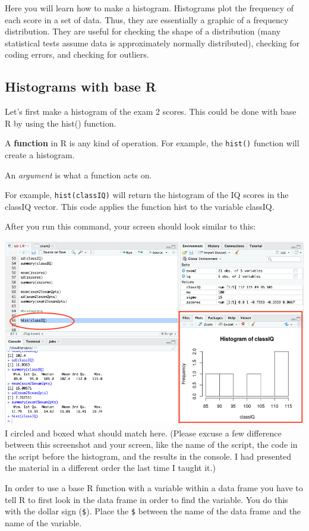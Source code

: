 \documentclass[
]{book}
\begin{document}
Here you will learn how to make a histogram. Histograms plot the frequency of each score in a set of data. Thus, they are essentially a graphic of a frequency distribution. They are useful for checking the shape of a distribution (many statistical tests assume data is approximately normally distributed), checking for coding errors, and checking for outliers.

\hypertarget{histograms-with-base-r}{%
\subsection{Histograms with base R}\label{histograms-with-base-r}}

Let's first make a histogram of the exam 2 scores. This could be done with base R by using the hist() function.

A \textbf{function} in R is any kind of operation. For example, the \texttt{hist()} function will create a histogram.

An \emph{argument} is what a function acts on.

For example, \texttt{hist(classIQ)} will return the histogram of the IQ scores in the classIQ vector. This code applies the function hist to the variable classIQ.

After you run this command, your screen should look similar to this:

\includegraphics{img/basehist.png}
I circled and boxed what should match here. (Please excuse a few difference between this screenshot and your screen, like the name of the script, the code in the script before the histogram, and the results in the console. I had presented the material in a different order the last time I taught it.)

In order to use a base R function with a variable within a data frame you have to tell R to first look in the data frame in order to find the variable. You do this with the dollar sign (\texttt{\$}). Place the \texttt{\$} between the name of the data frame and the name of the variable.
\end{document}
